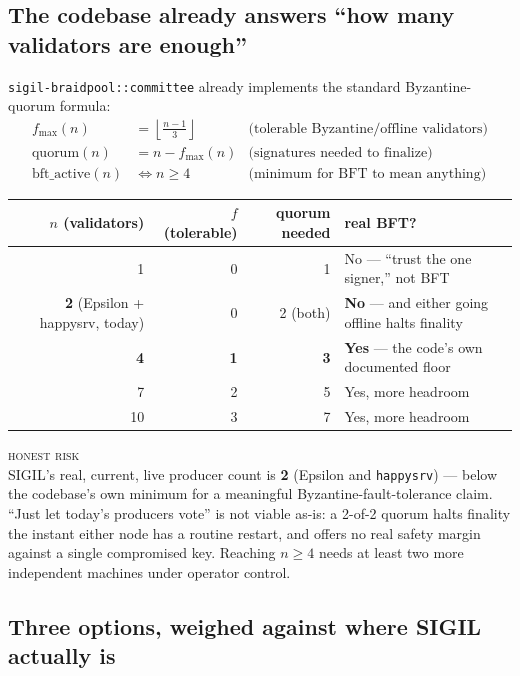 \documentclass[10pt,a4paper]{article}
\newcommand{\warnbox}[1]{%
\begin{tcolorbox}[enhanced,
  interior style={left color=warn!8,right color=white},
  colframe=warn!55!slate,boxrule=0.5pt,arc=3pt,
  borderline west={2.5pt}{0pt}{warn},
  left=9pt,right=9pt,top=7pt,bottom=7pt]
{\scriptsize\textcolor{warn}{\textsc{honest risk}}}\\[3pt]
\small #1
\end{tcolorbox}}
\begin{document}
\subsection{The codebase already answers ``how many validators are enough''}

\texttt{sigil-braidpool::committee} already implements the standard Byzantine-quorum formula:
\begin{align*}
  f_{\max}(n) &= \left\lfloor \frac{n-1}{3} \right\rfloor & \text{(tolerable Byzantine/offline validators)}\\
  \text{quorum}(n) &= n - f_{\max}(n) & \text{(signatures needed to finalize)}\\
  \text{bft\_active}(n) &\iff n \geq 4 & \text{(minimum for BFT to mean anything)}
\end{align*}

\begin{center}
\begin{tabular}{@{}rrrl@{}}
\toprule
$n$ (validators) & $f$ (tolerable) & quorum needed & real BFT? \\
\midrule
1 & 0 & 1 & No — ``trust the one signer,'' not BFT \\
\textbf{2} (Epsilon + happysrv, today) & 0 & 2 (both) & \textbf{No} — and either going offline halts finality \\
\textbf{4} & \textbf{1} & \textbf{3} & \textbf{Yes} — the code's own documented floor \\
7 & 2 & 5 & Yes, more headroom \\
10 & 3 & 7 & Yes, more headroom \\
\bottomrule
\end{tabular}
\end{center}

\warnbox{SIGIL's real, current, live producer count is \textbf{2} (Epsilon and \texttt{happysrv}) — below
the codebase's own minimum for a meaningful Byzantine-fault-tolerance claim. ``Just let today's producers
vote'' is not viable as-is: a 2-of-2 quorum halts finality the instant either node has a routine
restart, and offers no real safety margin against a single compromised key. Reaching $n\!\geq\!4$ needs
at least two more independent machines under operator control.}

\subsection{Three options, weighed against where SIGIL actually is}
\end{document}
